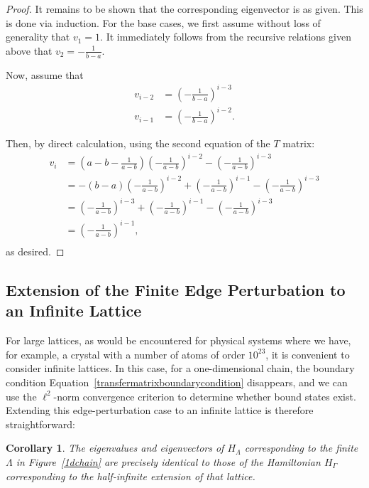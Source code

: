 \documentclass{article}
\newtheorem{corollary}{Corollary}
\newcommand{\hl}{H_\Lambda}
\newcommand{\hg}{H_\Gamma}
\numberwithin{equation}{section}
\numberwithin{theorem}{section}
\numberwithin{proposition}{section}
\numberwithin{lemma}{section}
\numberwithin{corollary}{section}
\numberwithin{definition}{section}
\begin{document}
\begin{proof}
It remains to be shown that the corresponding eigenvector is as given. This is done via induction. For the base cases, we first assume without loss of generality that $v_1 = 1$. It immediately follows from the recursive relations given above that $v_2 = -\frac{1}{b-a}$.

Now, assume that
\begin{align*}
	v_{i-2} &= \left( - \frac{1}{b-a} \right) ^ {i-3} \\
	v_{i-1} &= \left( - \frac{1}{b-a} \right) ^ {i-2}.
\end{align*}

Then, by direct calculation, using the second equation of the $T$ matrix:
\begin{align*}
	v_i &= \left( a - b - \frac{1}{a-b} \right) \left(- \frac{1}{a-b} \right)^{i-2} - \left(- \frac{1}{a-b} \right)^{i-3} \\
	&= -(b-a) \left(- \frac{1}{a-b} \right)^{i-2} + \left(- \frac{1}{a-b} \right)^{i-1} - \left(- \frac{1}{a-b} \right)^{i-3} \\
	&= \left(- \frac{1}{a-b} \right)^{i-3} + \left(- \frac{1}{a-b} \right)^{i-1} - \left(- \frac{1}{a-b} \right)^{i-3} \\
	&= \left(- \frac{1}{a-b} \right)^{i-1}, \\
\end{align*}
as desired.

\end{proof}

\subsection{Extension of the Finite Edge Perturbation to an Infinite Lattice}

For large lattices, as would be encountered for physical systems where we have, for example, a crystal with a number of atoms of order $10^{23}$, it is convenient to consider infinite lattices. In this case, for a one-dimensional chain, the boundary condition Equation~\ref{transfermatrixboundarycondition} disappears, and we can use the $\ell^2$-norm convergence criterion to determine whether bound states exist. Extending this edge-perturbation case to an infinite lattice is therefore straightforward:

\begin{corollary}
	The eigenvalues and eigenvectors of $\hl$ corresponding to the finite $\Lambda$ in Figure~\ref{1dchain} are precisely identical to those of the Hamiltonian $\hg$ corresponding to the half-infinite extension of that lattice.
\end{corollary}
\end{document}
